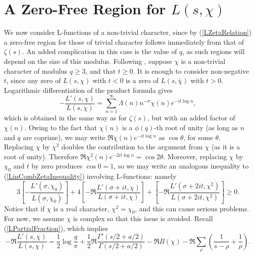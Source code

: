 \section{A Zero-Free Region for \texorpdfstring{$L(s, \chi)$}{Lg}}
We now consider L-functions of a non-trivial character, since by (\ref{LZetaRelation}) a zero-free region for those of trivial character follows immediately from that of $\zeta(s)$. An added complication in this case is the value of $q$, as such regions will depend on the size of this modulus. Following \cite[Chapter~14]{davenport}, suppose $\chi$ is a non-trivial character of modulus $q \geq 3$, and that $t \geq 0$. It is enough to consider non-negative $t$, since any zero of $L(s, \chi)$ with $t < 0$ is a zero of $L(s, \overline{\chi})$ with $t > 0$. Logarithmic differentiation of the product formula gives 
\begin{equation}
\label{LoverLExplicit}
    -\frac{L'(s, \chi)}{L(s, \chi)} = \sum_{n=1}^{\infty}\Lambda(n) n^{-\sigma}\chi(n)e^{-i t \log n},
\end{equation}
which is obtained in the same way as for $\zeta(s)$, but with an added factor of $\chi(n)$. Owing to the fact that $\chi(n)$ is a $\phi(q)$-th root of unity (as long as $n$ and $q$ are coprime), we may write $\mathfrak{R}\chi(n)e^{-i t \log n}$ as $\cos\theta$, for some $\theta$. Replacing $\chi$ by $\chi^{2}$ doubles the contribution to the argument from $\chi$ (as it is a root of unity). Therefore $\mathfrak{R}\chi^{2}(n)e^{-2 i t \log n} = \cos 2\theta$. Moreover, replacing $\chi$ by $\chi_0$ and $t$ by zero produces $\cos 0 = 1$, so we may write an analogous inequality to (\ref{LinCombZetaInequality}) involving L-functions: namely
\begin{equation}
\label{LinCombLRelation}
    3\left[-\frac{L'(\sigma, \chi_0)}{L(\sigma, \chi_0)} \right] + 4\left[-\mathfrak{R} \frac{L'(\sigma + i t, \chi)}{L(\sigma + i t, \chi)} \right] + \left[-\mathfrak{R} \frac{L'(\sigma + 2i t, \chi^{2})}{L(\sigma + 2i t, \chi^{2})} \right] \geq 0.
\end{equation}
Notice that if $\chi$ is a real character, $\chi^{2} = \chi_0$, and this can cause serious problems. For now, we assume $\chi$ is complex so that this issue is avoided. Recall (\ref{LPartialFraction}), which implies 
\begin{equation}
\label{RealLogDiffL}
    -\mathfrak{R}\frac{L'(s, \chi)}{L(s, \chi)} = \frac12 \log\frac{q}{\pi} + \frac12 \mathfrak{R}\frac{\Gamma'(s/2 + a/2)}{\Gamma(s/2 + a/2)} - \mathfrak{R}B(\chi) - \mathfrak{R}\sum_{\rho} \left( \frac{1}{s - \rho} + \frac{1}{\rho} \right). \nonumber
\end{equation}

